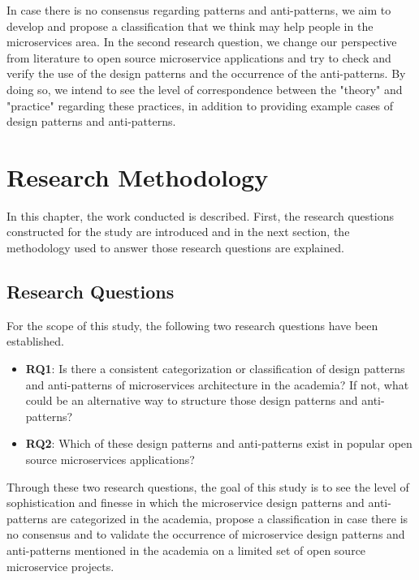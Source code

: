 \documentclass{Configuration_Files/PoliMi3i_thesis}
\begin{document}
In case there is no consensus regarding patterns and anti-patterns, we aim to develop and propose a classification that we think may help people in the microservices area.
In the second research question, we change our perspective from literature to open source microservice applications and try to check and verify the use of the design patterns and the occurrence of the anti-patterns.
By doing so, we intend to see the level of correspondence between the "theory" and "practice" regarding these practices, in addition to providing example cases of design patterns and anti-patterns.

\chapter{Research Methodology}
\label{ch:research_method}%

In this chapter, the work conducted is described.
First, the research questions constructed for the study are introduced and in the next section, the methodology used to answer those research questions are explained.

\section{Research Questions}
\label{sec:research_questions}

For the scope of this study, the following two research questions have been established.

\begin{itemize}
    \item \textbf{RQ1}: Is there a consistent categorization or classification of design patterns and anti-patterns of microservices architecture in the academia?
    If not, what could be an alternative way to structure those design patterns and anti-patterns?
    
    \item \textbf{RQ2}: Which of these design patterns and anti-patterns exist in popular open source microservices applications?
\end{itemize}

Through these two research questions, the goal of this study is to see the level of sophistication and finesse in which the microservice design patterns and anti-patterns are categorized in the academia, propose a classification in case there is no consensus and to validate the occurrence of microservice design patterns and anti-patterns mentioned in the academia on a limited set of open source microservice projects.
\end{document}

